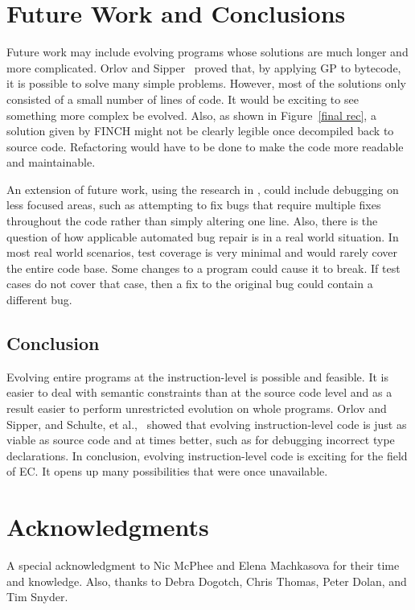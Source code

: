 \documentclass{sig-alternate}
\begin{document}
\section{Future Work and Conclusions}

Future work may include evolving programs whose solutions are much longer and more complicated. Orlov and Sipper~\cite{FINCH:2011} proved that, by applying GP to bytecode, it is possible to solve many simple problems. However, most of the solutions only consisted of a small number of lines of code. It would be exciting to see something more complex be evolved. Also, as shown in Figure~\ref{final rec}, a solution given by FINCH might not be clearly legible once decompiled back to source code. Refactoring would have to be done to make the code more readable and maintainable.

An extension of future work, using the research in \cite{Assembly:2010}, could include debugging on less focused areas, such as attempting to fix bugs that require multiple fixes throughout the code rather than simply altering one line. Also, there is the question of how applicable automated bug repair is in a real world situation. In most real world scenarios, test coverage is very minimal and would rarely cover the entire code base. Some changes to a program could cause it to break. If test cases do not cover that case, then a fix to the original bug could contain a different bug. 


\subsection{Conclusion}
Evolving entire programs at the instruction-level is possible and feasible. It is easier to deal with semantic constraints than at the source code level and as a result easier to perform unrestricted evolution on whole programs. Orlov and Sipper, and Schulte, et al.,~\cite{FINCH:2011,Assembly:2010} showed that evolving instruction-level code is just as viable as source code and at times better, such as for debugging incorrect type declarations. In conclusion, evolving instruction-level code is exciting for the field of EC. It opens up many possibilities that were once unavailable.

\section*{Acknowledgments}
A special acknowledgment to Nic McPhee and Elena Machkasova for their time and knowledge. Also, thanks to Debra Dogotch, Chris Thomas, Peter Dolan, and Tim Snyder.

%

%
%
\end{document}
